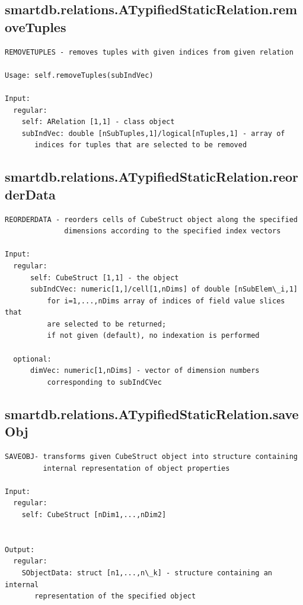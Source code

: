 \documentclass[letterpaper,10pt,english]{sphinxmanual}
\begin{document}
\subsection{smartdb.relations.ATypifiedStaticRelation.removeTuples}
\label{chap_functions:smartdb-relations-atypifiedstaticrelation-removetuples}
\begin{Verbatim}[commandchars=\\\{\}]
REMOVETUPLES - removes tuples with given indices from given relation

Usage: self.removeTuples(subIndVec)

Input:
  regular:
    self: ARelation [1,1] - class object
    subIndVec: double [nSubTuples,1]/logical[nTuples,1] - array of
       indices for tuples that are selected to be removed
\end{Verbatim}


\subsection{smartdb.relations.ATypifiedStaticRelation.reorderData}
\label{chap_functions:smartdb-relations-atypifiedstaticrelation-reorderdata}
\begin{Verbatim}[commandchars=\\\{\}]
REORDERDATA - reorders cells of CubeStruct object along the specified
              dimensions according to the specified index vectors

Input:
  regular:
      self: CubeStruct [1,1] - the object
      subIndCVec: numeric[1,]/cell[1,nDims] of double [nSubElem\_i,1]
          for i=1,...,nDims array of indices of field value slices that
          are selected to be returned;
          if not given (default), no indexation is performed

  optional:
      dimVec: numeric[1,nDims] - vector of dimension numbers
          corresponding to subIndCVec
\end{Verbatim}


\subsection{smartdb.relations.ATypifiedStaticRelation.saveObj}
\label{chap_functions:smartdb-relations-atypifiedstaticrelation-saveobj}
\begin{Verbatim}[commandchars=\\\{\}]
SAVEOBJ- transforms given CubeStruct object into structure containing
         internal representation of object properties

Input:
  regular:
    self: CubeStruct [nDim1,...,nDim2]


Output:
  regular:
    SObjectData: struct [n1,...,n\_k] - structure containing an internal
       representation of the specified object
\end{Verbatim}
\end{document}
